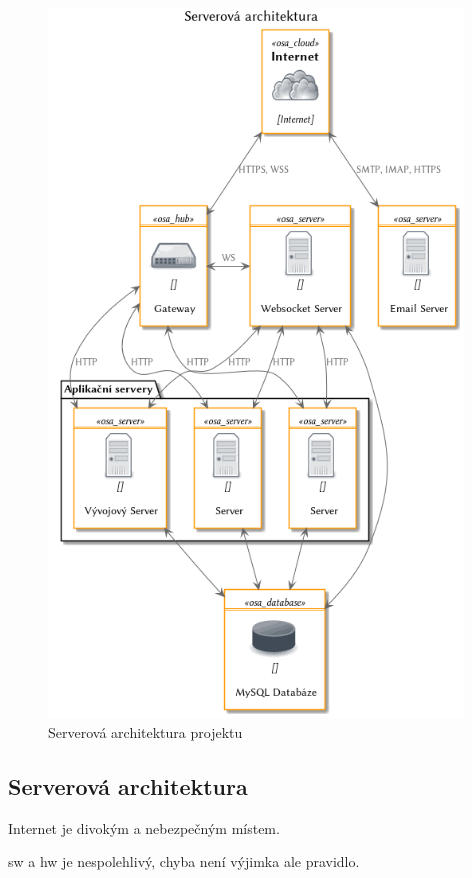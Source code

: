 \begin{figure}[!ht]
\centering
\includegraphics[width=11cm]{img/serverova-architektura.png}
\caption{Serverová architektura projektu \bso}
\label{fig:servery}
\end{figure}

\clearpage

\subsection{Serverová architektura}

\emptyLine

\begin{displayquote}
Internet je divokým a nebezpečným místem\cite{internet-is-dangerous-place}.
\end{displayquote}

\begin{displayquote}
\acrlong{sw} a \acrlong{hw} je nespolehlivý, chyba není výjimka ale pravidlo\cite{failure-is-rule-not-exception}.
\end{displayquote}

